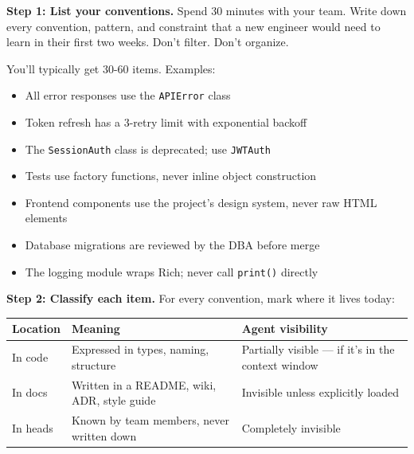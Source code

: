 \documentclass[
  a4paper,
  DIV=11,
  numbers=noendperiod]{scrreprt}
\newcounter{none} %
\providecommand{\tightlist}{%
  \setlength{\itemsep}{0pt}\setlength{\parskip}{0pt}}
\begin{document}
\textbf{Step 1: List your conventions.} Spend 30 minutes with your team.
Write down every convention, pattern, and constraint that a new engineer
would need to learn in their first two weeks. Don't filter. Don't
organize.

You'll typically get 30-60 items. Examples:

\begin{itemize}
\tightlist
\item
  All error responses use the \texttt{APIError} class
\item
  Token refresh has a 3-retry limit with exponential backoff
\item
  The \texttt{SessionAuth} class is deprecated; use \texttt{JWTAuth}
\item
  Tests use factory functions, never inline object construction
\item
  Frontend components use the project's design system, never raw HTML
  elements
\item
  Database migrations are reviewed by the DBA before merge
\item
  The logging module wraps Rich; never call \texttt{print()} directly
\end{itemize}

\textbf{Step 2: Classify each item.} For every convention, mark where it
lives today:

{\def\LTcaptype{none} %
\begin{longtable}[]{@{}
  >{\raggedright\arraybackslash}p{}
  >{\raggedright\arraybackslash}p{}
  >{\raggedright\arraybackslash}p{}@{}}
\toprule\noalign{}
\begin{minipage}[b]{\linewidth}\raggedright
Location
\end{minipage} & \begin{minipage}[b]{\linewidth}\raggedright
Meaning
\end{minipage} & \begin{minipage}[b]{\linewidth}\raggedright
Agent visibility
\end{minipage} \\
\midrule\noalign{}
\endhead
\bottomrule\noalign{}
\endlastfoot
In code & Expressed in types, naming, structure & Partially visible ---
if it's in the context window \\
In docs & Written in a README, wiki, ADR, style guide & Invisible unless
explicitly loaded \\
In heads & Known by team members, never written down & Completely
invisible \\
\end{longtable}
}
\end{document}
